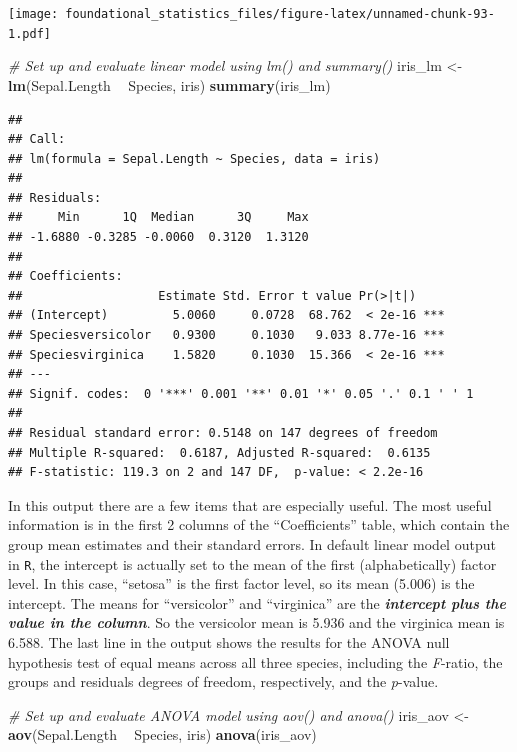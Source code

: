 \documentclass[]{book}
\newenvironment{Shaded}{\begin{snugshade}}{\end{snugshade}}
\newcommand{\CommentTok}[1]{\textcolor[rgb]{0.56,0.35,0.01}{\textit{#1}}}
\newcommand{\KeywordTok}[1]{\textcolor[rgb]{0.13,0.29,0.53}{\textbf{#1}}}
\newcommand{\NormalTok}[1]{#1}
\newcommand{\OperatorTok}[1]{\textcolor[rgb]{0.81,0.36,0.00}{\textbf{#1}}}
\newcommand{\StringTok}[1]{\textcolor[rgb]{0.31,0.60,0.02}{#1}}
\begin{document}
\texttt{[image: foundational\_statistics\_files/figure-latex/unnamed-chunk-93-1.pdf]}

\begin{Shaded}
\begin{Highlighting}[]
\CommentTok{# Set up and evaluate linear model using lm() and summary()}
\NormalTok{iris_lm <-}\StringTok{ }\KeywordTok{lm}\NormalTok{(Sepal.Length }\OperatorTok{~}\StringTok{ }\NormalTok{Species, iris)}
\KeywordTok{summary}\NormalTok{(iris_lm)}
\end{Highlighting}
\end{Shaded}

\begin{verbatim}
## 
## Call:
## lm(formula = Sepal.Length ~ Species, data = iris)
## 
## Residuals:
##     Min      1Q  Median      3Q     Max 
## -1.6880 -0.3285 -0.0060  0.3120  1.3120 
## 
## Coefficients:
##                   Estimate Std. Error t value Pr(>|t|)    
## (Intercept)         5.0060     0.0728  68.762  < 2e-16 ***
## Speciesversicolor   0.9300     0.1030   9.033 8.77e-16 ***
## Speciesvirginica    1.5820     0.1030  15.366  < 2e-16 ***
## ---
## Signif. codes:  0 '***' 0.001 '**' 0.01 '*' 0.05 '.' 0.1 ' ' 1
## 
## Residual standard error: 0.5148 on 147 degrees of freedom
## Multiple R-squared:  0.6187, Adjusted R-squared:  0.6135 
## F-statistic: 119.3 on 2 and 147 DF,  p-value: < 2.2e-16
\end{verbatim}

In this output there are a few items that are especially useful. The most useful information is in the first 2 columns of the ``Coefficients'' table, which contain the group mean estimates and their standard errors. In default linear model output in \texttt{R}, the intercept is actually set to the mean of the first (alphabetically) factor level. In this case, ``setosa'' is the first factor level, so its mean (5.006) is the intercept. The means for ``versicolor'' and ``virginica'' are the \textbf{\emph{intercept plus the value in the column}}. So the versicolor mean is 5.936 and the virginica mean is 6.588. The last line in the output shows the results for the ANOVA null hypothesis test of equal means across all three species, including the \emph{F}-ratio, the groups and residuals degrees of freedom, respectively, and the \emph{p}-value.

\begin{Shaded}
\begin{Highlighting}[]
\CommentTok{# Set up and evaluate ANOVA model using aov() and anova()}
\NormalTok{iris_aov <-}\StringTok{ }\KeywordTok{aov}\NormalTok{(Sepal.Length }\OperatorTok{~}\StringTok{ }\NormalTok{Species, iris)}
\KeywordTok{anova}\NormalTok{(iris_aov)}
\end{Highlighting}
\end{Shaded}
\end{document}

